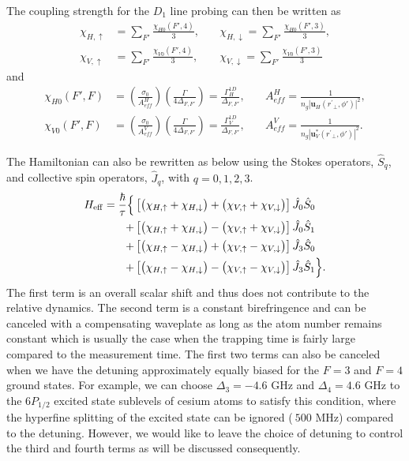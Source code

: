 \documentclass[preprint,aps,pra,onecolumn]{revtex4-1} %
\begin{document}
The coupling strength for the $ D_1 $ line probing can then be written as
\begin{align}
\chi_{H,\uparrow} &=  \sum_{F'} \frac{\chi_{H0}(F',4)}{3}, \quad
&\chi_{H,\downarrow} = \sum_{F'} \frac{\chi_{H0}(F',3) }{3}, \\
\chi_{V,\uparrow} &=  \sum_{F'} \frac{\chi_{V0}(F',4)}{3}, \quad
&\chi_{V,\downarrow} = \sum_{F'} \frac{\chi_{V0}(F',3) }{3} 
\end{align}
and 
\begin{align}
\chi_{H0}(F',F) &= \left( \frac{ \sigma_0}{A_{ef\!f}^H} \right) \left( \frac{\Gamma}{4 \Delta_{F,F'}} \right)=\frac{\Gamma_H^{1D}}{\Delta_{F,F'}},\quad
& A_{ef\!f}^H = \frac{1}{n_g|\mathbf{u}_{H}(r^\prime\!\!_\perp,\phi')|^2 },\\
\chi_{V0}(F',F) &= \left( \frac{ \sigma_0}{A_{ef\!f}^V} \right) \left( \frac{\Gamma}{4 \Delta_{F,F'}} \right)=\frac{\Gamma_V^{1D}}{\Delta_{F,F'}},\quad
& A_{ef\!f}^V = \frac{1}{n_g|\mathbf{u}^*_{V}(r^\prime\!\!_\perp,\phi')|^2 }.
\end{align}

The Hamiltonian can also be rewritten as below using the Stokes operators, $ \hat{S}_q $, and collective spin operators, $ \hat{J}_q $, with $ q=0,1,2,3 $.
\begin{align}
H_{\rm eff} 
=\frac{\hbar}{\tau} \Big\{ & \left[ \big( \chi_{H,\uparrow} + \chi_{H,\downarrow}\big) + \big(\chi_{V,\uparrow} + \chi_{V,\downarrow}\big) \right] \hat{J}_0 \hat{S}_0 \nonumber \\
+ & \left[ \big( \chi_{H, \uparrow} + \chi_{H,\downarrow}\big) - \big( \chi_{V,\uparrow} + \chi_{V,\downarrow} \big)\right]  \hat{J}_0 \hat{S}_1 \nonumber \\
+ & \left[ \big( \chi_{H,\uparrow} - \chi_{H,\downarrow}\big) + \big(\chi_{V,\uparrow} - \chi_{V,\downarrow} \big) \right] \hat{J}_3 \hat{S}_0 \nonumber \\
+ & \left[ \big( \chi_{H,\uparrow} - \chi_{H,\downarrow}\big) - \big(\chi_{V,\uparrow} - \chi_{V,\downarrow} \big) \right]  \hat{J}_3 \hat{S}_1\Big\}.
\end{align}
The first term is an overall scalar shift and thus does not contribute to the relative dynamics.  The second term is a constant birefringence and can be canceled with a compensating waveplate as long as the atom number remains constant which is usually the case when the trapping time is fairly large compared to the measurement time. The first two terms can also be canceled when we have the detuning approximately equally biased for the $ F=3 $ and $ F=4 $ ground states. 
For example, we  can choose $ \Delta_3=-4.6 $ GHz and $ \Delta_4=4.6 $ GHz to the $ 6P_{1/2} $ excited state sublevels of cesium atoms to satisfy this condition, where the hyperfine splitting of the excited state can be ignored ($ ~500 $ MHz) compared to the detuning. However, we would like to leave the choice of detuning to control the third and fourth terms as will be discussed consequently. 
\end{document}
